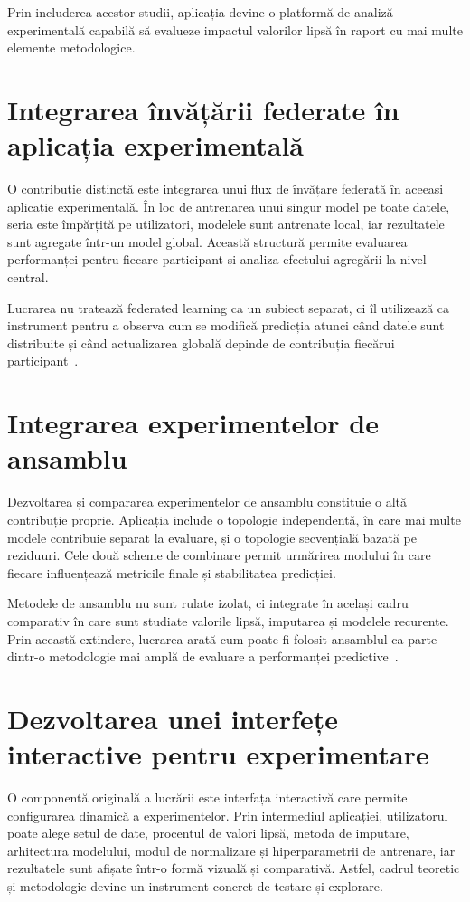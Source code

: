 Prin includerea acestor studii, aplicația devine o platformă de analiză experimentală capabilă să evalueze impactul valorilor lipsă în raport cu mai multe elemente metodologice.

\section{Integrarea învățării federate în aplicația experimentală}

O contribuție distinctă este integrarea unui flux de învățare federată în aceeași aplicație experimentală. În loc de antrenarea unui singur model pe toate datele, seria este împărțită pe utilizatori, modelele sunt antrenate local, iar rezultatele sunt agregate într-un model global. Această structură permite evaluarea performanței pentru fiecare participant și analiza efectului agregării la nivel central.

Lucrarea nu tratează federated learning ca un subiect separat, ci îl utilizează ca instrument pentru a observa cum se modifică predicția atunci când datele sunt distribuite și când actualizarea globală depinde de contribuția fiecărui participant~\cite{mcmahan2017fedavg, kairouz2021fl}.

\section{Integrarea experimentelor de ansamblu}

Dezvoltarea și compararea experimentelor de ansamblu constituie o altă contribuție proprie. Aplicația include o topologie independentă, în care mai multe modele contribuie separat la evaluare, și o topologie secvențială bazată pe reziduuri. Cele două scheme de combinare permit urmărirea modului în care fiecare influențează metricile finale și stabilitatea predicției.

Metodele de ansamblu nu sunt rulate izolat, ci integrate în același cadru comparativ în care sunt studiate valorile lipsă, imputarea și modelele recurente. Prin această extindere, lucrarea arată cum poate fi folosit ansamblul ca parte dintr-o metodologie mai amplă de evaluare a performanței predictive~\cite{dietterich2000ensemble, zhou2012ensemble}.

\section{Dezvoltarea unei interfețe interactive pentru experimentare}

O componentă originală a lucrării este interfața interactivă care permite configurarea dinamică a experimentelor. Prin intermediul aplicației, utilizatorul poate alege setul de date, procentul de valori lipsă, metoda de imputare, arhitectura modelului, modul de normalizare și hiperparametrii de antrenare, iar rezultatele sunt afișate într-o formă vizuală și comparativă. Astfel, cadrul teoretic și metodologic devine un instrument concret de testare și explorare.

